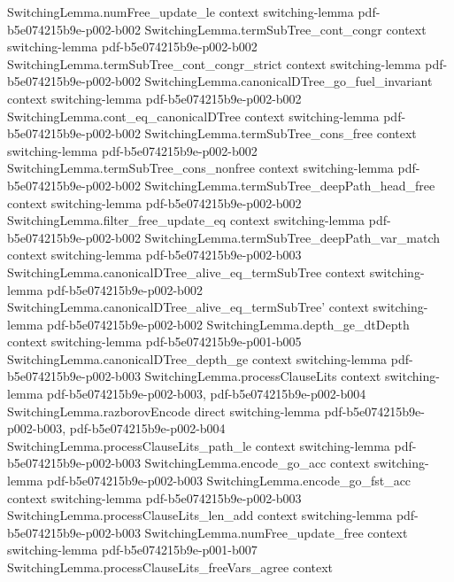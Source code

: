 \begin{lemma}
\proofstep
  {SwitchingLemma.numFree_update_le}
  {context}
  {switching-lemma}
  {pdf-b5e074215b9e-p002-b002}
\proofstep
  {SwitchingLemma.termSubTree_cont_congr}
  {context}
  {switching-lemma}
  {pdf-b5e074215b9e-p002-b002}
\proofstep
  {SwitchingLemma.termSubTree_cont_congr_strict}
  {context}
  {switching-lemma}
  {pdf-b5e074215b9e-p002-b002}
\proofstep
  {SwitchingLemma.canonicalDTree_go_fuel_invariant}
  {context}
  {switching-lemma}
  {pdf-b5e074215b9e-p002-b002}
\proofstep
  {SwitchingLemma.cont_eq_canonicalDTree}
  {context}
  {switching-lemma}
  {pdf-b5e074215b9e-p002-b002}
\proofstep
  {SwitchingLemma.termSubTree_cons_free}
  {context}
  {switching-lemma}
  {pdf-b5e074215b9e-p002-b002}
\proofstep
  {SwitchingLemma.termSubTree_cons_nonfree}
  {context}
  {switching-lemma}
  {pdf-b5e074215b9e-p002-b002}
\proofstep
  {SwitchingLemma.termSubTree_deepPath_head_free}
  {context}
  {switching-lemma}
  {pdf-b5e074215b9e-p002-b002}
\proofstep
  {SwitchingLemma.filter_free_update_eq}
  {context}
  {switching-lemma}
  {pdf-b5e074215b9e-p002-b002}
\proofstep
  {SwitchingLemma.termSubTree_deepPath_var_match}
  {context}
  {switching-lemma}
  {pdf-b5e074215b9e-p002-b003}
\proofstep
  {SwitchingLemma.canonicalDTree_alive_eq_termSubTree}
  {context}
  {switching-lemma}
  {pdf-b5e074215b9e-p002-b002}
\proofstep
  {SwitchingLemma.canonicalDTree_alive_eq_termSubTree'}
  {context}
  {switching-lemma}
  {pdf-b5e074215b9e-p002-b002}
\proofstep
  {SwitchingLemma.depth_ge_dtDepth}
  {context}
  {switching-lemma}
  {pdf-b5e074215b9e-p001-b005}
\proofstep
  {SwitchingLemma.canonicalDTree_depth_ge}
  {context}
  {switching-lemma}
  {pdf-b5e074215b9e-p002-b003}
\proofstep
  {SwitchingLemma.processClauseLits}
  {context}
  {switching-lemma}
  {pdf-b5e074215b9e-p002-b003,
    pdf-b5e074215b9e-p002-b004}
\proofstep
  {SwitchingLemma.razborovEncode}
  {direct}
  {switching-lemma}
  {pdf-b5e074215b9e-p002-b003,
    pdf-b5e074215b9e-p002-b004}
\proofstep
  {SwitchingLemma.processClauseLits_path_le}
  {context}
  {switching-lemma}
  {pdf-b5e074215b9e-p002-b003}
\proofstep
  {SwitchingLemma.encode_go_acc}
  {context}
  {switching-lemma}
  {pdf-b5e074215b9e-p002-b003}
\proofstep
  {SwitchingLemma.encode_go_fst_acc}
  {context}
  {switching-lemma}
  {pdf-b5e074215b9e-p002-b003}
\proofstep
  {SwitchingLemma.processClauseLits_len_add}
  {context}
  {switching-lemma}
  {pdf-b5e074215b9e-p002-b003}
\proofstep
  {SwitchingLemma.numFree_update_free}
  {context}
  {switching-lemma}
  {pdf-b5e074215b9e-p001-b007}
\proofstep
  {SwitchingLemma.processClauseLits_freeVars_agree}
  {context}

\end{lemma}
